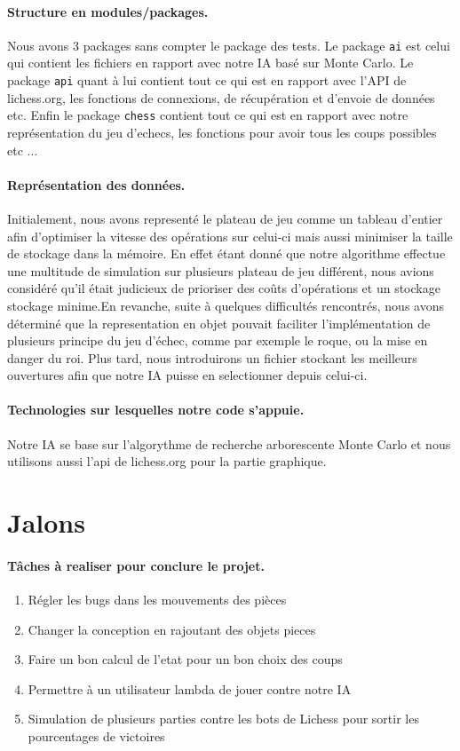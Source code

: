 \documentclass{article}
\begin{document}
\paragraph{Structure en modules/packages.} Nous avons 3 packages sans compter le package des tests. Le
package {\tt ai} est celui qui contient les fichiers en rapport avec notre IA basé sur Monte Carlo. Le package
{\tt api} quant à lui contient tout ce qui est en rapport avec l'API de lichess.org, les fonctions de connexions,
de récupération et d'envoie de données etc. Enfin le package {\tt chess} contient tout ce qui est en rapport avec
notre représentation du jeu d'echecs, les fonctions pour avoir tous les coups possibles etc ...

\paragraph{Représentation des données.} Initialement, nous avons representé le plateau de jeu comme un tableau d'entier afin d'optimiser la vitesse des opérations sur celui-ci mais aussi minimiser la taille de stockage dans la mémoire. En effet étant donné que notre algorithme effectue une multitude de simulation sur plusieurs plateau de jeu différent, nous avions considéré qu'il était judicieux de prioriser des coûts d'opérations et un stockage stockage minime.En revanche, suite à quelques difficultés rencontrés, nous avons déterminé que la representation en objet pouvait faciliter l'implémentation de plusieurs principe du jeu d'échec, comme par exemple le roque, ou la mise en danger du roi.   
Plus tard, nous introduirons un fichier stockant les meilleurs ouvertures afin que notre IA puisse en selectionner depuis celui-ci.

\paragraph{Technologies sur lesquelles notre code s'appuie.} Notre IA se base sur l'algorythme de recherche arborescente Monte Carlo et nous utilisons aussi l'api de lichess.org pour la partie graphique.

\section{Jalons}

\paragraph{Tâches à realiser pour conclure le projet.} 
\begin{enumerate}
  \item Régler les bugs dans les mouvements des pièces
  \item Changer la conception en rajoutant des objets pieces
  \item Faire un bon calcul de l'etat pour un bon choix des coups
  \item Permettre à un utilisateur lambda de jouer contre notre IA
  \item Simulation de  plusieurs parties contre les bots de Lichess pour sortir les pourcentages de victoires
\end{enumerate}
\end{document}

